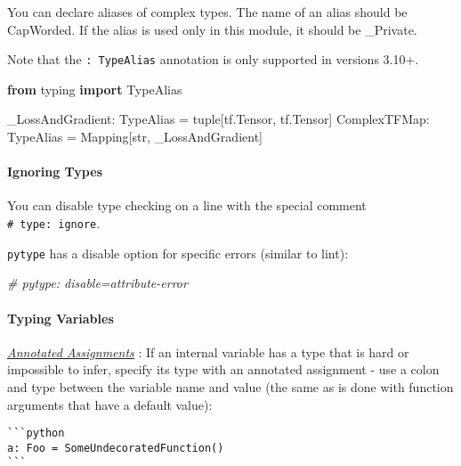 \documentclass[
]{article}
\newenvironment{Shaded}{}{}
\newcommand{\BuiltInTok}[1]{\textcolor[rgb]{0.00,0.50,0.00}{#1}}
\newcommand{\CommentTok}[1]{\textcolor[rgb]{0.38,0.63,0.69}{\textit{#1}}}
\newcommand{\ImportTok}[1]{\textcolor[rgb]{0.00,0.50,0.00}{\textbf{#1}}}
\newcommand{\NormalTok}[1]{#1}
\newcommand{\OperatorTok}[1]{\textcolor[rgb]{0.40,0.40,0.40}{#1}}
\begin{document}
You can declare aliases of complex types. The name of an alias should be
CapWorded. If the alias is used only in this module, it should be
\_Private.

Note that the \texttt{:\ TypeAlias} annotation is only supported in
versions 3.10+.

\begin{samepage}
\begin{Shaded}
\begin{Highlighting}[]
\ImportTok{from}\NormalTok{ typing }\ImportTok{import}\NormalTok{ TypeAlias}

\NormalTok{\_LossAndGradient: TypeAlias }\OperatorTok{=} \BuiltInTok{tuple}\NormalTok{[tf.Tensor, tf.Tensor]}
\NormalTok{ComplexTFMap: TypeAlias }\OperatorTok{=}\NormalTok{ Mapping[}\BuiltInTok{str}\NormalTok{, \_LossAndGradient]}
\end{Highlighting}
\end{Shaded}
\end{samepage}

\paragraph{Ignoring Types}

You can disable type checking on a line with the special comment
\texttt{\#\ type:\ ignore}.

\texttt{pytype} has a disable option for specific errors (similar to
lint):

\begin{samepage}
\begin{Shaded}
\begin{Highlighting}[]
\CommentTok{\# pytype: disable=attribute{-}error}
\end{Highlighting}
\end{Shaded}
\end{samepage}

\paragraph{Typing Variables}

\hyperref[annotated-assignments]{\emph{Annotated Assignments}} : If an
internal variable has a type that is hard or impossible to infer,
specify its type with an annotated assignment - use a colon and type
between the variable name and value (the same as is done with function
arguments that have a default value):

\begin{verbatim}
```python
a: Foo = SomeUndecoratedFunction()
```
\end{verbatim}
\end{document}
